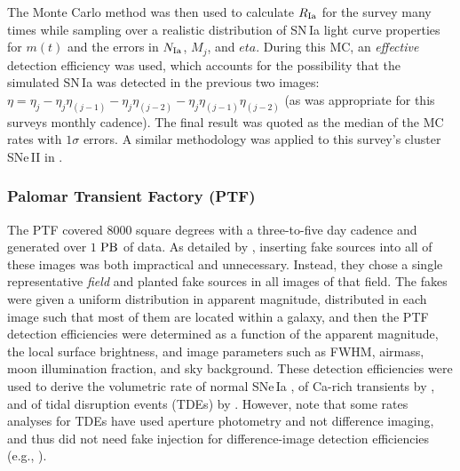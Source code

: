 The Monte Carlo method was then used to calculate $R_{\rm Ia}$ for the survey many times while sampling over a realistic distribution of SN\,Ia light curve properties for $m(t)$ and the errors in $N_{\rm Ia}$, $M_j$, and $eta$.
During this MC, an {\it effective} detection efficiency was used, which accounts for the possibility that the simulated SN\,Ia was detected in the previous two images: $\eta = \eta_j - \eta_j \eta_{(j-1)} - \eta_j \eta_{(j-2)} - \eta_j \eta_{(j-1)} \eta_{(j-2)}$ (as was appropriate for this surveys monthly cadence).
The final result was quoted as the median of the MC rates with $1\sigma$ errors. A similar methodology was applied to this survey's cluster SNe\,II in \cite{2012ApJ...753...68G}.

\subsubsection{Palomar Transient Factory (PTF)}

The PTF covered $8000$ square degrees with a three-to-five day cadence and generated over $1$ $\rm PB$ of data.
As detailed by \cite{2017ApJS..230....4F}, inserting fake sources into all of these images was both impractical and unnecessary.
Instead, they chose a single representative {\it field} and planted fake sources in all images of that field.
The fakes were given a uniform distribution in apparent magnitude, distributed in each image such that most of them are located within a galaxy, and then the PTF detection efficiencies were determined as a function of the apparent magnitude, the local surface brightness, and image parameters such as FWHM, airmass, moon illumination fraction, and sky background.
These detection efficiencies were used to derive the volumetric rate of normal SNe\,Ia \citep{2019MNRAS.tmp..772F}, of Ca-rich transients by \cite{2018ApJ...858...50F}, and of tidal disruption events (TDEs) by \cite{2018ApJS..238...15H}.
However, note that some rates analyses for TDEs have used aperture photometry and not difference imaging, and thus did not need fake injection for difference-image detection efficiencies (e.g., \cite{2016MNRAS.455.2918H}).



